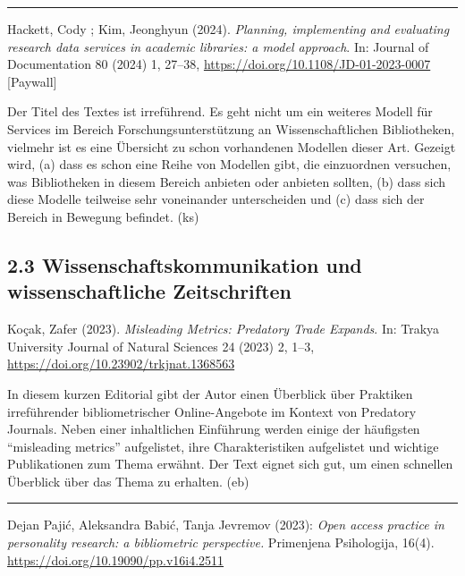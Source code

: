 \documentclass[a4paper,
fontsize=11pt,
oneside,
numbers=noperiodatend,
parskip=half-,
bibliography=totoc,
final
]{scrartcl}
\begin{document}
\begin{center}\rule{0.5\linewidth}{0.5pt}\end{center}

Hackett, Cody ; Kim, Jeonghyun (2024). \emph{Planning, implementing and
evaluating research data services in academic libraries: a model
approach}. In: Journal of Documentation 80 (2024) 1, 27--38,
\url{https://doi.org/10.1108/JD-01-2023-0007} {[}Paywall{]}

Der Titel des Textes ist irreführend. Es geht nicht um ein weiteres
Modell für Services im Bereich Forschungsunterstützung an
Wissenschaftlichen Bibliotheken, vielmehr ist es eine Übersicht zu schon
vorhandenen Modellen dieser Art. Gezeigt wird, (a) dass es schon eine
Reihe von Modellen gibt, die einzuordnen versuchen, was Bibliotheken in
diesem Bereich anbieten oder anbieten sollten, (b) dass sich diese
Modelle teilweise sehr voneinander unterscheiden und (c) dass sich der
Bereich in Bewegung befindet. (ks)

\hypertarget{wissenschaftskommunikation-und-wissenschaftliche-zeitschriften}{%
\subsection{2.3 Wissenschaftskommunikation und wissenschaftliche
Zeitschriften}\label{wissenschaftskommunikation-und-wissenschaftliche-zeitschriften}}

Koçak, Zafer (2023). \emph{Misleading Metrics: Predatory Trade Expands}.
In: Trakya University Journal of Natural Sciences 24 (2023) 2, 1--3,
\url{https://doi.org/10.23902/trkjnat.1368563}

In diesem kurzen Editorial gibt der Autor einen Überblick über Praktiken
irreführender bibliometrischer Online-Angebote im Kontext von Predatory
Journals. Neben einer inhaltlichen Einführung werden einige der
häufigsten \enquote{misleading metrics} aufgelistet, ihre
Charakteristiken aufgelistet und wichtige Publikationen zum Thema
erwähnt. Der Text eignet sich gut, um einen schnellen Überblick über das
Thema zu erhalten. (eb)

\begin{center}\rule{0.5\linewidth}{0.5pt}\end{center}

Dejan Pajić, Aleksandra Babić, Tanja Jevremov (2023): \emph{Open access
practice in personality research: a bibliometric perspective.}
Primenjena Psihologija, 16(4).
\url{https://doi.org/10.19090/pp.v16i4.2511}
\end{document}
